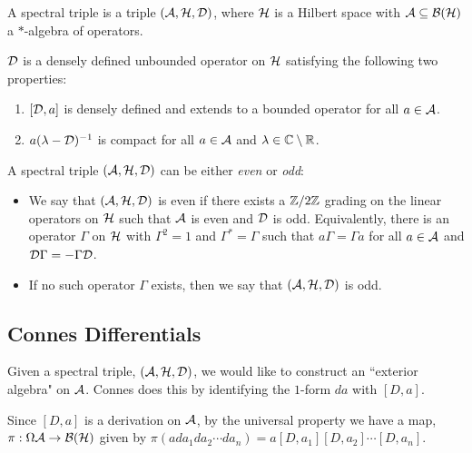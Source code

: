 \begin{definition}
    A spectral triple is a triple $(\mathcal{A},\mathcal{H},\mathcal{D})$, where
    $\mathcal{H}$ is a Hilbert space with $\mathcal{A} \subseteq \mathcal{B}(\mathcal{H})$
    a $*$-algebra of operators.
    
    $\mathcal{D}$ is a densely defined unbounded operator on $\mathcal{H}$ satisfying the following
    two properties:
    \begin{enumerate}
        \item{} $[\mathcal{D},a]$ is densely defined and extends to a bounded operator
        for all $a \in \mathcal{A}$.
        \item{} $a(\lambda -\mathcal{D})^{-1}$ is compact for all $a \in \mathcal{A}$ and $\lambda \in \mathbb{C}\setminus \mathbb{R}$.
    \end{enumerate}
    
    A spectral triple $(\mathcal{A},\mathcal{H},\mathcal{D})$ can be either \emph{even} or \emph{odd}:
    \begin{itemize}
        \item{} We say that $(\mathcal{A},\mathcal{H},\mathcal{D})$ is even if there exists a
        $\mathbb{Z}/2\mathbb{Z}$ grading on the linear operators on $\mathcal{H}$ such that $\mathcal{A}$
        is even and $\mathcal{D}$ is odd. Equivalently, there is an operator $\Gamma$
        on $\mathcal{H}$ with $\Gamma^2 = 1$ and $\Gamma^* = \Gamma$ such that $a\Gamma = \Gamma a$ for all $a \in \mathcal{A}$
        and $\mathcal{D}\Gamma=-\Gamma\mathcal{D}$. 
        \item{} If no such operator $\Gamma$ exists, then we say that $(\mathcal{A},\mathcal{H},\mathcal{D})$
        is odd.
    \end{itemize}
\end{definition}



\subsection{Connes Differentials}
Given a spectral triple, $(\mathcal{A},\mathcal{H},\mathcal{D})$, we would like to construct an ``exterior algebra"
on $\mathcal{A}$. Connes does this by identifying the $1$-form $da$ with $[D,a]$.

Since $[D,a]$ is a derivation on $\mathcal{A}$, by the universal property we have a map, $\pi:\Omega\mathcal{A}\rightarrow \mathcal{B}(\mathcal{H})$
given by $\pi(ada_1da_2\cdots da_n) = a[D,a_1][D,a_2]\cdots[D,a_n]$.

